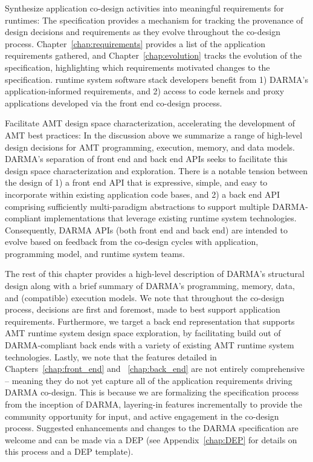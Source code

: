 \begin{compactdesc}
\item[Synthesize application co-design activities into meaningful requirements
  for runtimes:]
  The specification provides a mechanism for tracking the
  provenance of design decisions and requirements as they evolve throughout the
  \gls{co-design} process. Chapter~\ref{chap:requirements} provides a list of the application
  requirements gathered,  and Chapter~\ref{chap:evolution} tracks the evolution of
  the specification, highlighting which requirements motivated changes to the specification.
  \Gls{runtime system} software stack developers benefit 
  from 1) \gls{DARMA}’s application-informed requirements, and 2) access to code
  kernels and proxy applications developed via the \gls{front end}
  \gls{co-design} process.
\item[Facilitate AMT design space characterization, accelerating the
development of AMT best practices:]
  In the discussion above we summarize a range of high-level design decisions for
  \gls{AMT} programming, execution, memory, and data models. \gls{DARMA}'s
  separation of \gls{front end} and \gls{back end} \glspl{API} seeks to
  facilitate this design space characterization and exploration.  There 
  is a notable tension between the design of 1) a \gls{front end} \gls{API} that is expressive, simple, 
  and easy to incorporate within existing application code bases, and 2) a
  \gls{back end} \gls{API} comprising sufficiently multi-paradigm abstractions 
  to support multiple \gls{DARMA}-compliant implementations that leverage existing \gls{runtime
  system} technologies. 
  Consequently, \gls{DARMA} \gls{API}s (both \gls{front end} and \gls{back end}) are
  intended to evolve based on feedback from the \gls{co-design} cycles with 
  application, \gls{programming model}, and \gls{runtime system} teams. 
\end{compactdesc}


The rest of this chapter provides a high-level description of 
\gls{DARMA}'s structural design  along with a brief summary of \gls{DARMA}'s programming,
memory, data, and (compatible) execution models. We note that throughout the
\gls{co-design} process, decisions are first and foremost, 
made to best support application requirements.  Furthermore, we target a
\gls{back end} representation that supports \gls{AMT} \gls{runtime system}
design space exploration, by facilitating build out of \gls{DARMA}-compliant
back ends with a variety of existing \gls{AMT} \gls{runtime system}
technologies.
Lastly, we note that the features detailed in Chapters~\ref{chap:front_end} and
~\ref{chap:back_end}  are not entirely comprehensive -- meaning they do not yet capture all of the
application requirements driving \gls{DARMA} \gls{co-design}.  This is because 
we are formalizing the specification process from the inception of \gls{DARMA}, layering-in features incrementally to
provide the community opportunity for input, and active engagement in the
\gls{co-design} process.  Suggested enhancements and changes 
to the \gls{DARMA} specification are welcome and can be made via a \gls{DEP} (see
Appendix~\ref{chap:DEP} for details on this process and a \gls{DEP} template). 

